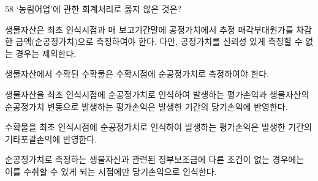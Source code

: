 \begin{question}{58}
‘농림어업’에 관한 회계처리로 옳지 않은 것은?
\begin{choices}
  \item 생물자산은 최초 인식시점과 매 보고기간말에 공정가치에서 추정 매각부대원가를 차감한 금액(순공정가치)으로 측정하여야 한다. 다만, 공정가치를 신뢰성 있게 측정할 수 없는 경우는 제외한다.
  \item 생물자산에서 수확된 수확물은 수확시점에 순공정가치로 측정하여야 한다.
  \item 생물자산을 최초 인식시점에 순공정가치로 인식하여 발생하는 평가손익과 생물자산의 순공정가치 변동으로 발생하는 평가손익은 발생한 기간의 당기손익에 반영한다.
  \item 수확물을 최초 인식시점에 순공정가치로 인식하여 발생하는 평가손익은 발생한 기간의 기타포괄손익에 반영한다.
  \item 순공정가치로 측정하는 생물자산과 관련된 정부보조금에 다른 조건이 없는 경우에는 이를 수취할 수 있게 되는 시점에만 당기손익으로 인식한다.
\end{choices}
\end{question}
